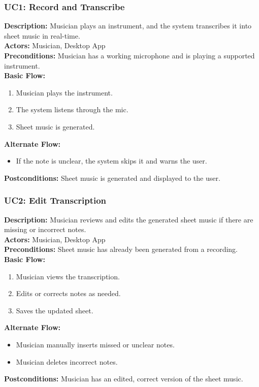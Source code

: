 \documentclass[12pt]{article}
\begin{document}
\subsubsection*{UC1: Record and Transcribe}
\textbf{Description:} Musician plays an instrument, and the system transcribes it into sheet music in real-time. \\
\textbf{Actors:} Musician, Desktop App \\
\textbf{Preconditions:} Musician has a working microphone and is playing a supported instrument. \\
\textbf{Basic Flow:}
\begin{enumerate}
    \item Musician plays the instrument.
    \item The system listens through the mic.
    \item Sheet music is generated.
\end{enumerate}
\textbf{Alternate Flow:}
\begin{itemize}
    \item If the note is unclear, the system skips it and warns the user.
\end{itemize}
\textbf{Postconditions:} Sheet music is generated and displayed to the user. 

\subsubsection*{UC2: Edit Transcription}
\textbf{Description:} Musician reviews and edits the generated sheet music if there are missing or incorrect notes. \\
\textbf{Actors:} Musician, Desktop App \\
\textbf{Preconditions:} Sheet music has already been generated from a recording. \\
\textbf{Basic Flow:}
\begin{enumerate}
    \item Musician views the transcription.
    \item Edits or corrects notes as needed.
    \item Saves the updated sheet.
\end{enumerate}
\textbf{Alternate Flow:}
\begin{itemize}
    \item Musician manually inserts missed or unclear notes.
    \item Musician deletes incorrect notes.
\end{itemize}
\textbf{Postconditions:} Musician has an edited, correct version of the sheet music.
\end{document}
